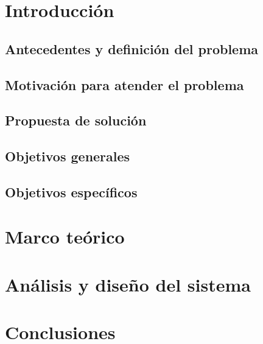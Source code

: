 \documentclass[12pt]{report}
\begin{document}
\newpage

 
\newpage


\newpage
\tableofcontents

\newpage
\listoftables
{} %
\listoffigures
{}
\lstlistoflistings

\chapter{Introducción}


\section{Antecedentes y definición del problema}


\section{Motivación para atender el problema}


\section{Propuesta de solución}


\section{Objetivos generales}


\section{Objetivos específicos}



\chapter{Marco teórico}


\chapter{Análisis y diseño del sistema}


\chapter{Conclusiones}


\printbibliography

\printglossary

\clearpage

\printglossary[type=\acronymtype]
\end{document}
